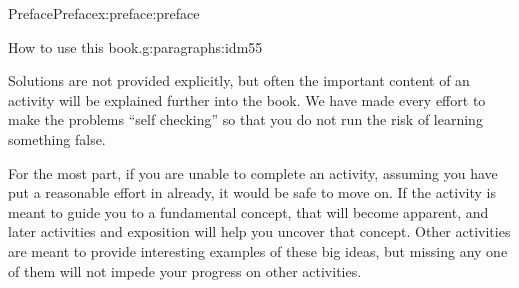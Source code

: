 \documentclass[oneside,10pt,]{book}
\numberwithin{equation}{chapter}
\begin{document}
\begin{preface}{Preface}{}{Preface}{}{}{x:preface:preface}
\begin{paragraphs}{How to use this book.}{g:paragraphs:idm55}
\par
Solutions are not provided explicitly, but often the important content of an activity will be explained further into the book.  We have made every effort to make the problems ``self checking'' so that you do not run the risk of learning something false.%
\par
For the most part, if you are unable to complete an activity, assuming you have put a reasonable effort in already, it would be safe to move on.  If the activity is meant to guide you to a fundamental concept, that will become apparent, and later activities and exposition will help you uncover that concept.  Other activities are meant to provide interesting examples of these big ideas, but missing any one of them will not impede your progress on other activities.%
\end{paragraphs}%
\end{preface}
\setcounter{tocdepth}{2}
\renewcommand*\contentsname{Contents}
\tableofcontents
\mainmatter
%
%
\typeout{************************************************}
\typeout{************************************************}
%
\end{document}
